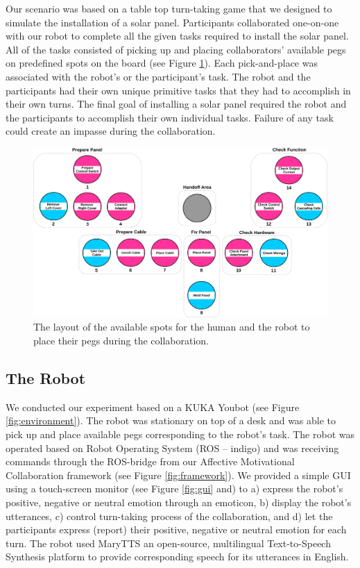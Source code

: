 \documentclass[12pt]{report}
\begin{document}
Our scenario was based on a table top turn-taking game that we designed to
simulate the installation of a solar panel. Participants collaborated one-on-one
with our robot to complete all the given tasks required to install the solar
panel. All of the tasks consisted of picking up and placing collaborators'
available pegs on predefined spots on the board (see Figure
\ref{fig:game_board}). Each pick-and-place was associated with the robot's or
the participant's task. The robot and the participants had their own unique
primitive tasks that they had to accomplish in their own turns. The final goal
of installing a solar panel required the robot and the participants to
accomplish their own individual tasks. Failure of any task could create an
impasse during the collaboration.

\begin{figure}[tbh]
  \centering
  \includegraphics[width=1\textwidth]{figure/gameBoard.pdf}
  \caption{\fontsize{10}{10}\selectfont The layout of the available spots for
  the human and the robot to place their pegs during the collaboration.}
  \label{fig:game_board}
\end{figure}

\subsection{The Robot}

We conducted our experiment based on a KUKA Youbot (see Figure
\ref{fig:environment}). The robot was stationary on top of a desk and was able
to pick up and place available pegs corresponding to the robot's task. The robot
was operated based on Robot Operating System (ROS -- indigo) and was receiving
commands through the ROS-bridge from our Affective Motivational Collaboration
framework (see Figure \ref{fig:framework}). We provided a simple GUI using a
touch-screen monitor (see Figure \ref{fig:gui} and) to a) express the robot's
positive, negative or neutral emotion through an emoticon, b) display the
robot's utterances, c) control turn-taking process of the collaboration, and d)
let the participants express (report) their positive, negative or neutral
emotion for each turn. The robot used MaryTTS an open-source, multilingual
Text-to-Speech Synthesis platform to provide corresponding speech for its
utterances in English.
\end{document}
